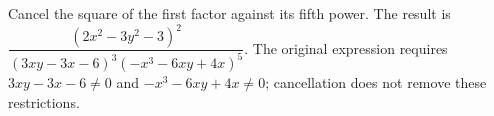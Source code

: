 Cancel the square of the first factor against its fifth power. The result is $\boxed{\dfrac{(2x^2-3y^2-3)^2}{(3xy-3x-6)^3(-x^3-6xy+4x)^5}}$. The original expression requires $3xy-3x-6\ne0$ and $-x^3-6xy+4x\ne0$; cancellation does not remove these restrictions.
